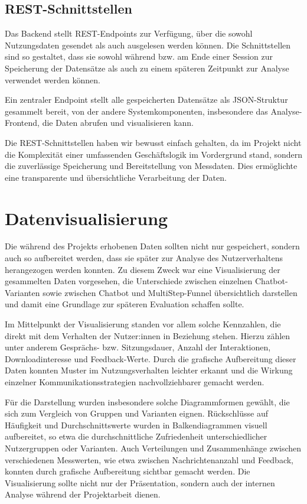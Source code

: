 \subsection{REST-Schnittstellen}

Das Backend stellt REST-Endpoints zur Verfügung, über die sowohl Nutzungsdaten 
gesendet als auch ausgelesen werden können. Die Schnittstellen sind so gestaltet, 
dass sie sowohl während bzw. am Ende einer Session zur Speicherung der Datensätze 
als auch zu einem späteren Zeitpunkt zur Analyse verwendet werden können.

Ein zentraler Endpoint stellt alle gespeicherten Datensätze als JSON-Struktur 
gesammelt bereit, von der andere Systemkomponenten, insbesondere das 
Analyse-Frontend, die Daten abrufen und visualisieren kann.

Die REST-Schnittstellen haben wir bewusst einfach gehalten, da im Projekt nicht 
die Komplexität einer umfassenden Geschäftslogik im Vordergrund stand, sondern 
die zuverlässige Speicherung und Bereitstellung von Messdaten. Dies ermöglichte 
eine transparente und übersichtliche Verarbeitung der Daten.

\section{Datenvisualisierung}

Die während des Projekts erhobenen Daten sollten nicht nur gespeichert,
sondern auch so aufbereitet werden, dass sie später zur Analyse des
Nutzerverhaltens herangezogen werden konnten. Zu diesem Zweck war eine
Visualisierung der gesammelten Daten vorgesehen, die Unterschiede
zwischen einzelnen Chatbot-Varianten sowie zwischen Chatbot und MultiStep-Funnel übersichtlich darstellen und damit eine Grundlage zur
späteren Evaluation schaffen sollte.

Im Mittelpunkt der Visualisierung standen vor allem solche Kennzahlen, die
direkt mit dem Verhalten der Nutzer:innen in Beziehung stehen. Hierzu zählen
unter anderem Gesprächs- bzw. Sitzungsdauer, Anzahl der
Interaktionen, Downloadinteresse und Feedback-Werte. Durch die grafische
Aufbereitung dieser Daten konnten Muster im Nutzungsverhalten leichter
erkannt und die Wirkung einzelner Kommunikationsstrategien
nachvollziehbarer gemacht werden.

Für die Darstellung wurden insbesondere solche Diagrammformen gewählt,
die sich zum Vergleich von Gruppen und Varianten eignen. Rückschlüsse auf
Häufigkeit und Durchschnittswerte wurden in Balkendiagrammen
visuell aufbereitet, so etwa die durchschnittliche Zufriedenheit
unterschiedlicher Nutzergruppen oder Varianten. Auch Verteilungen und
Zusammenhänge zwischen verschiedenen Messwerten, wie etwa zwischen
Nachrichtenanzahl und Feedback, konnten durch grafische
Aufbereitung sichtbar gemacht werden. Die Visualisierung sollte
nicht nur der Präsentation, sondern auch der internen Analyse während der
Projektarbeit dienen.

